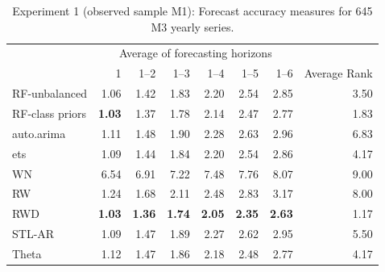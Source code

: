 \documentclass[11pt,a4paper,]{article}
\theoremstyle{definition}
\theoremstyle{definition}
\theoremstyle{definition}
\theoremstyle{remark}
\begin{document}
\begin{table}[!htbp]
\centering\small
\caption{Experiment 1 (observed sample M1): Forecast accuracy measures for 645 M3 yearly series.}
\label{YM3}
\begin{tabular}{lrrrrrrr}
\toprule
                & \multicolumn{6}{c}{Average of forecasting horizons} \\ 
                & 1         & 1--2      & 1--3      & 1--4      & 1--5      & 1--6      & Average Rank \\ 
\midrule
RF-unbalanced   & 1.06      & 1.42      & 1.83      & 2.20      & 2.54      & 2.85      & 3.50 \\
RF-class priors & \bf{1.03} & 1.37      & 1.78      & 2.14      & 2.47      & 2.77      & 1.83 \\
auto.arima      & 1.11      & 1.48      & 1.90      & 2.28      & 2.63      & 2.96      & 6.83 \\
ets             & 1.09      & 1.44      & 1.84      & 2.20      & 2.54      & 2.86      & 4.17\\
WN              & 6.54      & 6.91      & 7.22      & 7.48      & 7.76      & 8.07      & 9.00\\
RW              & 1.24      & 1.68      & 2.11      & 2.48      & 2.83      & 3.17      & 8.00 \\
RWD             & \bf{1.03} & \bf{1.36} & \bf{1.74} & \bf{2.05} & \bf{2.35} & \bf{2.63} & 1.17 \\
STL-AR          & 1.09      & 1.47      & 1.89      & 2.27      & 2.62      & 2.95      & 5.50 \\
Theta           & 1.12      & 1.47      & 1.86      & 2.18      & 2.48      & 2.77      & 4.17 \\ 
\bottomrule
\end{tabular}
\end{table}
\end{document}
